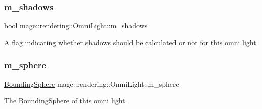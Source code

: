 \subsubsection{\texorpdfstring{m\+\_\+shadows}{m\_shadows}}
{\footnotesize\ttfamily bool mage\+::rendering\+::\+Omni\+Light\+::m\+\_\+shadows\hspace{0.3cm}{\ttfamily [private]}}

A flag indicating whether shadows should be calculated or not for this omni light. \hypertarget{classmage_1_1rendering_1_1_omni_light_af11a99e2b1500093b9bd0e3ff16b04e6}{}\label{classmage_1_1rendering_1_1_omni_light_af11a99e2b1500093b9bd0e3ff16b04e6} 
\subsubsection{\texorpdfstring{m\+\_\+sphere}{m\_sphere}}
{\footnotesize\ttfamily \hyperlink{classmage_1_1_bounding_sphere}{Bounding\+Sphere} mage\+::rendering\+::\+Omni\+Light\+::m\+\_\+sphere\hspace{0.3cm}{\ttfamily [private]}}

The \hyperlink{classmage_1_1_bounding_sphere}{Bounding\+Sphere} of this omni light. 